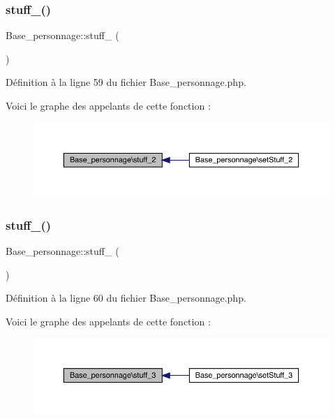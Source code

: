 \subsubsection{\texorpdfstring{stuff\+\_()}{stuff\_2()}}
{\footnotesize\ttfamily Base\+\_\+personnage\+::stuff\+\_ (\begin{DoxyParamCaption}{ }\end{DoxyParamCaption})}



Définition à la ligne 59 du fichier Base\+\_\+personnage.\+php.

Voici le graphe des appelants de cette fonction \+:\nopagebreak
\begin{figure}[H]
\begin{center}
\leavevmode
\includegraphics[width=350pt]{class_base__personnage_ae37a88e0e1535ff5f0d786c1007fbe1e_icgraph}
\end{center}
\end{figure}
\mbox{\label{class_base__personnage_a901d3c830ec965886fcf9c57ff153675}} 
\subsubsection{\texorpdfstring{stuff\+\_()}{stuff\_3()}}
{\footnotesize\ttfamily Base\+\_\+personnage\+::stuff\+\_ (\begin{DoxyParamCaption}{ }\end{DoxyParamCaption})}



Définition à la ligne 60 du fichier Base\+\_\+personnage.\+php.

Voici le graphe des appelants de cette fonction \+:\nopagebreak
\begin{figure}[H]
\begin{center}
\leavevmode
\includegraphics[width=350pt]{class_base__personnage_a901d3c830ec965886fcf9c57ff153675_icgraph}
\end{center}
\end{figure}
\mbox{\label{class_base__personnage_afb797796a81d9bec991ede838c711bd6}} 

